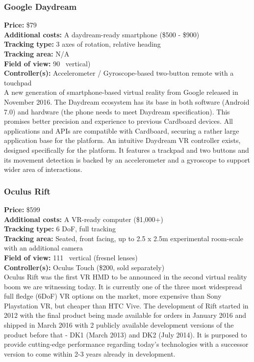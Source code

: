 \documentclass[12pt, a4paper]{article}
\begin{document}
\subsubsection{Google Daydream}
\vspace*{-5mm}
\textbf{Price:} \$79\\
\textbf{Additional costs:} A daydream-ready smartphone (\$500 - \$900)\\
\textbf{Tracking type:} 3 axes of rotation, relative heading\\
\textbf{Tracking area:} N/A\\
\textbf{Field of view:} 90\degree~ vertical)\\
\textbf{Controller(s):} Accelerometer / Gyroscope-based two-button remote with a touchpad \bigskip \\
A new generation of smartphone-based virtual reality from Google released in November 2016. The Daydream ecosystem has its base in both software (Android 7.0) and hardware (the phone needs to meet Daydream specification). This promises better precision and experience to previous Cardboard devices. All applications and APIs are compatible with Cardboard, securing a rather large application base for the platform.
An intuitive Daydream VR controller exists, designed specifically for the platform. It features a trackpad and two buttons and its movement detection is backed by an accelerometer and a gyroscope to support wider area of interactions.

\subsubsection{Oculus Rift}
\vspace*{-5mm}
\textbf{Price:} \$599\\
\textbf{Additional costs:} A VR-ready computer (\$1,000+)\\
\textbf{Tracking type:} 6 DoF, full tracking\\
\textbf{Tracking area:} Seated, front facing, up to 2.5 x 2.5m experimental room-scale with an additional camera\\
\textbf{Field of view:} 111\degree~ vertical (fresnel lenses)\\
\textbf{Controller(s):} Oculus Touch (\$200, sold separately) \bigskip \\
Oculus Rift was the first VR HMD to be announced in the second virtual reality boom we are witnessing today. It is currently one of the three most widespread full fledge (6DoF) VR options on the market, more expensive than Sony Playstation VR, but cheaper than HTC Vive. The development of Rift started in 2012 with the final product being made available for orders in January 2016 and shipped in March 2016 with 2 publicly available development versions of the product before that - DK1 (March 2013) and DK2 (July 2014). It is purposed to provide cutting-edge performance regarding today’s technologies with a successor version to come within 2-3 years already in development.
\end{document}
